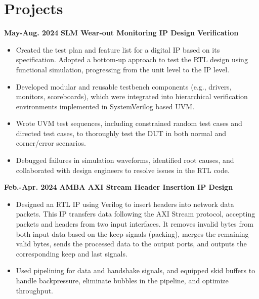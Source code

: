 \documentclass[11pt,a4paper,sans]{moderncv}
\begin{document}
\vspace{-0.3cm} 

\section{Projects}

\cventry
{\textnormal{\textbf{May-Aug. 2024}}}
{\textnormal{\textbf{SLM Wear-out Monitoring IP Design Verification}}}
{}{}{}
{
    \begin{itemize}
        \item Created the test plan and feature list for a digital IP based on its specification. Adopted a bottom-up approach to test the RTL design using functional simulation, progressing from the unit level to the IP level.
        \item Developed modular and reusable testbench components (e.g., drivers, monitors, scoreboards), which were integrated into hierarchical verification environments implemented in SystemVerilog based UVM.
        \item Wrote UVM test sequences, including constrained random test cases and directed test cases, to thoroughly test the DUT in both normal and corner/error scenarios.
        \item Debugged failures in simulation waveforms, identified root causes, and collaborated with design engineers to resolve issues in the RTL code.
    \end{itemize}
}


\cventry
{\textnormal{\textbf{Feb.-Apr. 2024}}}
{\textnormal{\textbf{AMBA AXI Stream Header Insertion IP Design}}}
{}{}{}
{
    \begin{itemize}
        \item Designed an RTL IP using Verilog to insert headers into network data packets. This IP transfers data following the AXI Stream protocol, accepting packets and headers from two input interfaces. It removes invalid bytes from both input data based on the keep signals (packing), merges the remaining valid bytes, sends the processed data to the output ports, and outputs the corresponding keep and last signals.
        \item Used pipelining for data and handshake signals, and equipped skid buffers to handle backpressure, eliminate bubbles in the pipeline, and optimize throughput.
    \end{itemize}
}
\end{document}
